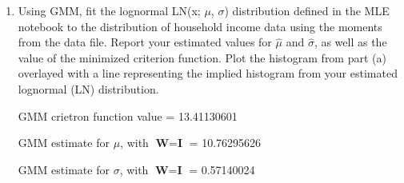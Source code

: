 \documentclass[letterpaper,12pt]{article}
\theoremstyle{definition}
\begin{document}
\begin{enumerate}
\begin{enumerate}
\item Using GMM, fit the lognormal LN(x; $\mu$, $\sigma$) distribution defined in the MLE notebook to the distribution of household income data using the moments from the data file. Report your estimated values for $\hat{\mu}$ and $\hat{\sigma}$, as well as the value of the minimized criterion function. Plot the histogram from part (a) overlayed with a line representing the implied histogram from your estimated lognormal (LN) distribution.
\par
\begin{figure}[H]\centering\captionsetup{width=4.0in}
\end{figure}
\par
GMM crietron function value = 13.41130601 \par
GMM estimate for $\mu$, with $\textbf{W} = \textbf{I}$ = 10.76295626\par
GMM estimate for $\sigma$, with $\textbf{W} = \textbf{I}$ = 0.57140024 \par
\bigskip


\end{enumerate}
\end{enumerate}
\end{document}
